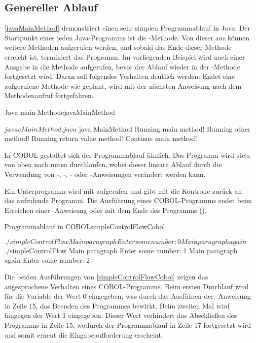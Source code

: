 \subsection{Genereller Ablauf} \label{generalablauf}

\autoref{javaMainMethod} demonstriert einen sehr simplen Programmablauf in Java. Der Startpunkt eines jeden Java-Programms ist die -Methode. Von dieser aus können weitere Methoden aufgerufen werden, und sobald das Ende dieser Methode erreicht ist, terminiert das Programm. Im vorliegenden Beispiel wird nach einer Ausgabe in  die Methode  aufgerufen, bevor der Ablauf wieder in der -Methode fortgesetzt wird. Daran soll folgendes Verhalten deutlich werden: Endet eine aufgerufene Methode wie geplant, wird mit der nächsten Anweisung nach dem Methodenaufruf fortgefahren. 

\begin{codeWithCaption}{Java main-Methode}{javaMainMethod}
\begin{shellwindow}
$ javac MainMethod.java 
$ java MainMethod
Running main method!
Running other method!
Running return value method!
Continue main method!
\end{shellwindow}
\end{codeWithCaption}

In COBOL gestaltet sich der Programmablauf ähnlich. Das Programm wird stets von oben nach unten durchlaufen, wobei dieser lineare Ablauf \zB durch die Verwendung von -, -, - oder -Anweisungen verändert werden kann.

Ein Unterprogramm wird mit  aufgerufen und gibt mit  die Kontrolle zurück an das aufrufende Programm. Die Ausführung eines COBOL-Programms endet beim Erreichen einer -Anweisung oder mit dem Ende des Programms (). 

\begin{codeWithCaption}{Programmablauf in COBOL}{simpleControlFlowCobol}
\begin{shellwindow}
$ ./simpleControlFlow 
Main paragraph
Enter some number: 0
Main paragraph again
$ ./simpleControlFlow 
Main paragraph
Enter some number: 1 
Main paragraph again
Enter some number: 2
\end{shellwindow}
\end{codeWithCaption}

Die beiden Ausführungen von \autoref{simpleControlFlowCobol} zeigen das angesprochene Verhalten eines COBOL-Programms. Beim ersten Durchlauf wird für die Variable  der Wert 0 eingegeben, was durch das Ausführen der -Anweisung in Zeile 15, das Beenden des Programmes bewirkt. Beim zweiten Mal wird hingegen der Wert 1 eingegeben. Dieser Wert verhindert das Abschließen des Programms in Zeile 15, wodurch der Programmablauf in Zeile 17 fortgesetzt wird und somit erneut die Eingabeaufforderung erscheint.

